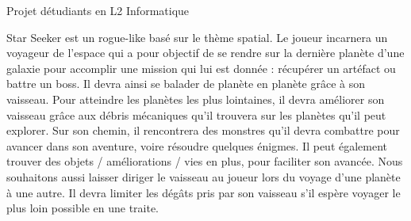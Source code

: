 Projet d\textquotesingle{}étudiants en L2 Informatique

Star Seeker est un rogue-\/like basé sur le thème spatial. Le joueur incarnera un voyageur de l’espace qui a pour objectif de se rendre sur la dernière planète d’une galaxie pour accomplir une mission qui lui est donnée \+: récupérer un artéfact ou battre un boss. Il devra ainsi se balader de planète en planète grâce à son vaisseau. Pour atteindre les planètes les plus lointaines, il devra améliorer son vaisseau grâce aux débris mécaniques qu’il trouvera sur les planètes qu’il peut explorer. Sur son chemin, il rencontrera des monstres qu’il devra combattre pour avancer dans son aventure, voire résoudre quelques énigmes. Il peut également trouver des objets / améliorations / vies en plus, pour faciliter son avancée. Nous souhaitons aussi laisser diriger le vaisseau au joueur lors du voyage d’une planète à une autre. Il devra limiter les dégâts pris par son vaisseau s’il espère voyager le plus loin possible en une traite. 